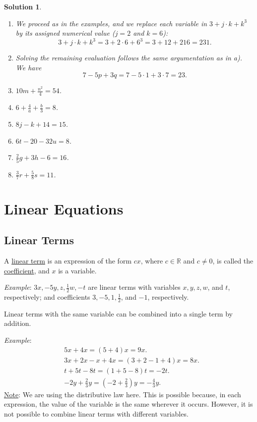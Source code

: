 \documentclass[12pt]{article}
\newtheorem{sol}[prop]{Solution}
\begin{document}
\begin{sol}
\begin{enumerate}
\item[a)] We proceed as in the examples, and we replace each variable  in $3+j\cdot k+k^{3}$  by its assigned numerical value ($j=2$ and $k=6$):
$$3+j\cdot k+k^{3}=3+2\cdot6+6^{3}=3+12+216=231.$$
\item[b)] Solving the remaining evaluation follows the same argumentation as in a). We have
$$7-5p+3q=7-5\cdot 1+3\cdot7=23.$$
\item[c)] $10m+\frac{n^{2}}{4}=54$.
\item[d)] $6+\frac{4}{a}+\frac{b}{3}=8$.
\item[e)] $8j-k+14=15$.
\item[f)] $6t-20-32u=8$. 
\item[g)] $\frac{2}{5}g+3h-6=16$.
\item[h)] $\frac{3}{7}r+\frac{5}{8}s=11$.
\end{enumerate}
\end{sol}

\section{Linear Equations}
\subsection{Linear Terms}
A \underline{linear term} is an expression of the form $cx$, where $c\in \mathbb{R}$ and $c\neq 0$, is  called the \underline{coefficient}, and $x$ is a variable. 

\textit{Example}: $3x, -5y, z, \frac{1}{2}w, -t$ are linear terms with variables $x,y,z,w$, and $t$, respectively; and coefficients $3, -5, 1, \frac{1}{2}$, and $-1$, respectively.

Linear terms with the same variable can be combined into a single term by addition.

\textit{Example}: 
\begin{equation*}
\begin{split}
& 5x + 4x = (5 + 4)x = 9x.\\
& 3x + 2x - x + 4x = (3 + 2 - 1 + 4)x = 8x.\\
& t + 5t - 8t = (1 + 5 - 8)t = -2t.\\
& -2y +\frac{2}{3}y =(-2 +\frac{2}{3})y= -\frac{4}{3}y.
\end{split}
\end{equation*}
\underline{Note}: We are using the distributive law here. This is possible because, in each expression, the value of the variable is the same wherever it occurs. However, it is not possible to combine linear terms with different variables. 
\end{document}
